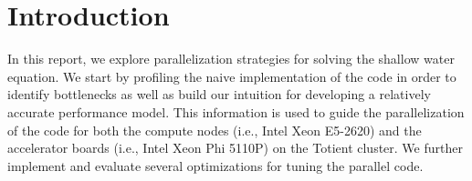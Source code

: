 
\section{Introduction}
\label{sec-intro}

In this report, we explore parallelization strategies for solving the
shallow water equation. We start by profiling the naive implementation of
the code in order to identify bottlenecks as well as build our intuition
for developing a relatively accurate performance model. This information
is used to guide the parallelization of the code for both the compute
nodes (i.e., Intel Xeon E5-2620) and the accelerator boards (i.e., Intel
Xeon Phi 5110P) on the Totient cluster. We further implement and evaluate
several optimizations for tuning the parallel code.

